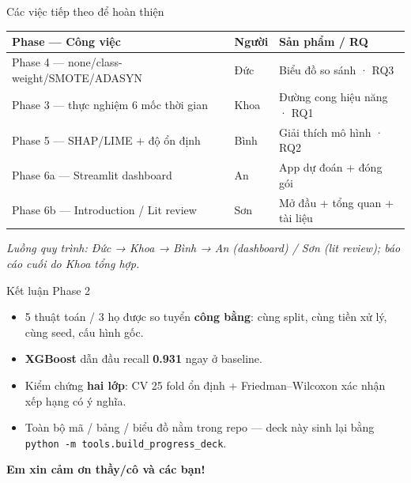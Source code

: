 \documentclass[aspectratio=169,11pt]{beamer}
\begin{document}
\begin{frame}{Các việc tiếp theo để hoàn thiện}
\small
\begin{tabular}{@{}lll@{}}
\toprule
\textbf{Phase — Công việc} & \textbf{Người} & \textbf{Sản phẩm / RQ} \\
\midrule
Phase 4 — none/class-weight/SMOTE/ADASYN & Đức & Biểu đồ so sánh · RQ3 \\
Phase 3 — thực nghiệm 6 mốc thời gian & Khoa & Đường cong hiệu năng · RQ1 \\
Phase 5 — SHAP/LIME + độ ổn định & Bình & Giải thích mô hình · RQ2 \\
Phase 6a — Streamlit dashboard & An & App dự đoán + đóng gói \\
Phase 6b — Introduction / Lit review & Sơn & Mở đầu + tổng quan + tài liệu \\
\bottomrule
\end{tabular}
\vspace{3mm}

\emph{Luồng quy trình: Đức → Khoa → Bình → An (dashboard) / Sơn (lit review); báo cáo cuối do Khoa tổng hợp.}
\end{frame}

\begin{frame}{Kết luận Phase 2}
\begin{itemize}
  \item 5 thuật toán / 3 họ được so tuyển \textbf{công bằng}: cùng split, cùng tiền xử lý, cùng seed, cấu hình gốc.
  \item \textbf{XGBoost} dẫn đầu recall \textbf{0.931} ngay ở baseline.
  \item Kiểm chứng \textbf{hai lớp}: CV 25 fold ổn định + Friedman--Wilcoxon xác nhận xếp hạng có ý nghĩa.
  \item Toàn bộ mã / bảng / biểu đồ nằm trong repo — deck này sinh lại bằng \texttt{python -m tools.build\_progress\_deck}.
\end{itemize}
\vspace{3mm}
\centering\color{themecol}\textbf{Em xin cảm ơn thầy/cô và các bạn!}
\end{frame}
\end{document}

